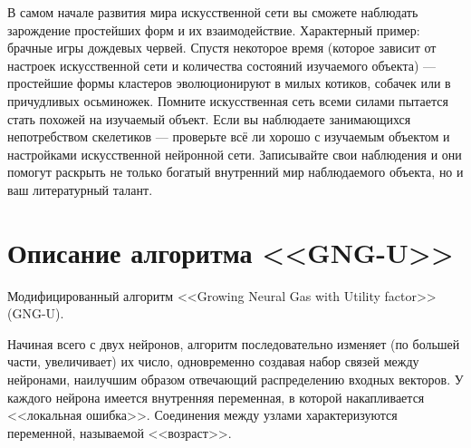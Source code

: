 \documentclass[unicode, 12pt, a4paper,oneside,fleqn]{article}
\begin{document}
В самом начале развития мира искусственной сети вы сможете наблюдать
зарождение простейших форм и их взаимодействие. Характерный пример:
брачные игры дождевых червей. Спустя некоторое время (которое зависит
от настроек искусственной сети и количества состояний изучаемого
объекта) --- простейшие формы кластеров эволюционируют в милых
котиков, собачек или в причудливых осьминожек. Помните искусственная
сеть всеми силами пытается стать похожей на изучаемый объект. Если вы
наблюдаете занимающихся непотребством скелетиков --- проверьте всё ли
хорошо с изучаемым объектом и настройками искусственной нейронной
сети. Записывайте свои наблюдения и они помогут раскрыть не только
богатый внутренний мир наблюдаемого объекта, но и ваш литературный
талант.



\section{Описание алгоритма <<GNG-U>>}
Модифицированный алгоритм <<Growing Neural Gas with Utility factor>>
(GNG-U).

Начиная всего с двух нейронов, алгоритм последовательно изменяет (по
большей части, увеличивает) их число, одновременно создавая набор
связей между нейронами, наилучшим образом отвечающий распределению
входных векторов. У каждого нейрона имеется внутренняя переменная, в
которой накапливается <<локальная ошибка>>. Соединения между узлами
характеризуются переменной, называемой <<возраст>>.
\end{document}
